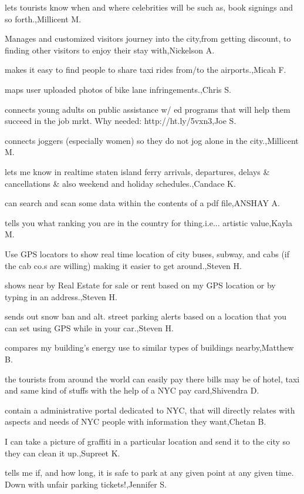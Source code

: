 \documentclass{article}
\begin{document}
lets tourists know when and where celebrities will be such as, book signings and so forth.,Millicent M.

Manages and customized visitors journey into the city,from getting discount, to finding other visitors to enjoy their stay with,Nickelson A.

makes it easy to find people to share taxi rides from/to the airports.,Micah F.

maps user uploaded photos of bike lane infringements.,Chris S.

connects young adults on public assistance w/ ed programs that will help them succeed in the job mrkt. Why needed: http://ht.ly/5vxn3,Joe S.

connects joggers (especially women) so they do not jog alone in the city.,Millicent M.

lets me know in realtime staten island ferry arrivals, departures, delays \& cancellations \& also weekend and holiday schedules.,Candace K.

can search and scan some data within the contents of a pdf file,ANSHAY A.

tells you what ranking you are in the country for thing.i.e... artistic value,Kayla M.

Use GPS locators to show real time location of city buses, subway, and cabs (if the cab co.s are willing) making it easier to get around.,Steven H.

shows near by Real Estate for sale or rent based on my GPS location or by typing in an address.,Steven H.

sends out snow ban and alt. street parking alerts based on a location that you can set using GPS while in your car.,Steven H.

compares my building's energy use to similar types of buildings nearby,Matthew B.

the tourists from around the world can easily pay there bills may be of hotel, taxi and same kind of stuffs with the help of a NYC pay card,Shivendra D.

contain a administrative portal dedicated to NYC, that will directly relates with aspects and needs of NYC people with information they want,Chetan B.

I can take a picture of graffiti in a particular location and send it to the city so they can clean it up.,Supreet K.

tells me if, and how long, it is safe to park at any given point at any given time. Down with unfair parking tickets!,Jennifer S.
\end{document}
